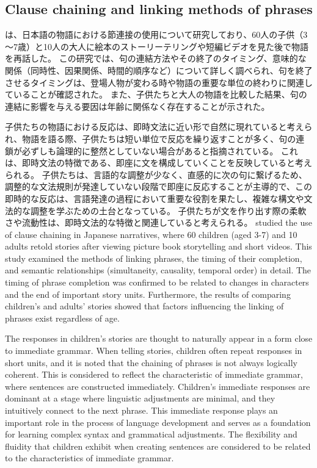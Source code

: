 \documentclass[a4paper]{article}
\begin{document}
  \subsection{Clause chaining and linking methods of phrases}
\fi

\ifJPN
\textcite{10.3389/fpsyg.2019.03008}は、日本語の物語における節連接の使用について研究しており、60人の子供（3～7歳）と10人の大人に絵本のストーリーテリングや短編ビデオを見た後で物語を再話した。
この研究では、句の連結方法やその終了のタイミング、意味的な関係（同時性、因果関係、時間的順序など）について詳しく調べられ、句を終了させるタイミングは、登場人物が変わる時や物語の重要な単位の終わりに関連していることが確認された。
また、子供たちと大人の物語を比較した結果、句の連結に影響を与える要因は年齢に関係なく存在することが示された。

子供たちの物語における反応は、即時文法に近い形で自然に現れていると考えられ、物語を語る際、子供たちは短い単位で反応を繰り返すことが多く、句の連鎖が必ずしも論理的に整然としていない場合があると指摘されている。
これは、即時文法の特徴である、即座に文を構成していくことを反映していると考えられる。
子供たちは、言語的な調整が少なく、直感的に次の句に繋げるため、調整的な文法規則が発達していない段階で即座に反応することが主導的で、この即時的な反応は、言語発達の過程において重要な役割を果たし、複雑な構文や文法的な調整を学ぶための土台となっている。
子供たちが文を作り出す際の柔軟さや流動性は、即時文法的な特徴と関連していると考えられる。
\else
  \textcite{10.3389/fpsyg.2019.03008} studied the use of clause chaining in Japanese narratives, where 60 children (aged 3-7) and 10 adults retold stories after viewing picture book storytelling and short videos. This study examined the methods of linking phrases, the timing of their completion, and semantic relationships (simultaneity, causality, temporal order) in detail. The timing of phrase completion was confirmed to be related to changes in characters and the end of important story units. Furthermore, the results of comparing children's and adults' stories showed that factors influencing the linking of phrases exist regardless of age.  

  The responses in children's stories are thought to naturally appear in a form close to immediate grammar. When telling stories, children often repeat responses in short units, and it is noted that the chaining of phrases is not always logically coherent. This is considered to reflect the characteristic of immediate grammar, where sentences are constructed immediately. Children's immediate responses are dominant at a stage where linguistic adjustments are minimal, and they intuitively connect to the next phrase. This immediate response plays an important role in the process of language development and serves as a foundation for learning complex syntax and grammatical adjustments. The flexibility and fluidity that children exhibit when creating sentences are considered to be related to the characteristics of immediate grammar.
\fi
\end{document}
